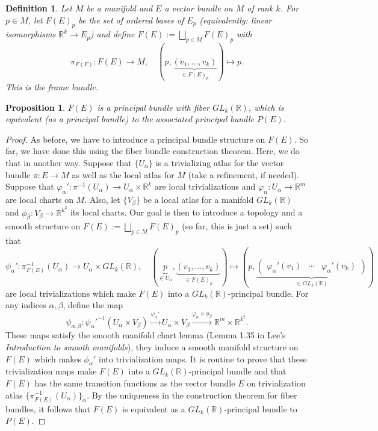 \documentclass[10pt, a4paper]{article}
\newtheorem{proposition}[thm]{Proposition}
\newtheorem{defi}[thm]{Definition}
\newenvironment{noticeB}{%
  \tcolorbox[%
  notitle,
  empty,
  enhanced,  %
  breakable,
  coltext=black,
  colback=white, 
  fontupper=\rmfamily,
  noparskip,
  sharp corners,
  boxrule=-1pt,  %
  frame hidden,
  left=7pt,  %
  right=7pt,
  top=5pt,
  bottom=5pt,
  before skip=2.5ex plus 2pt,
  after skip=2.5ex plus 2pt,
  borderline west = {1.5pt}{-0.1pt}{blue!30!black}, %
  overlay unbroken and last={%
    \draw[color=black, line width=1.25pt]
    ($(frame.south west)+(1.pt, -0.1pt)$) -- ++(2em, 0);
  }
  ]}
{\endtcolorbox}
\newenvironment{definition}{\begin{noticeB}\begin{defi}}{%
    \end{defi}\end{noticeB}}
\newenvironment{noticeC}{%
  \tcolorbox[%
  notitle,
  empty,
  enhanced,  %
  breakable,
  coltext=black, 
  fontupper=\rmfamily,
  noparskip,
  sharp corners,
  boxrule=-1pt,  %
  frame hidden,
  left=7pt,  %
  right=7pt,
  top=5pt,
  bottom=5pt,
  before skip=2.5ex plus 2pt,
  after skip=2.5ex plus 2pt,
  overlay unbroken and last={%
  },
  ]}
{\endtcolorbox}
\newenvironment{myproof}%
  {\begin{noticeC}\begin{proof}}%
  {\end{proof}\end{noticeC}}
\newcommand{\R}{\mathbb {R}}
\begin{document}
\begin{definition}
  Let $M$ be a manifold and $E$ a vector bundle on $M$ of rank $k$.
  For $p \in M$, let $F(E)_p$ be the set of ordered bases of $E_p$ 
  (equivalently: linear isomorphisms $\R^k \to E_p$) and define $F(E) := \bigsqcup_{p \in M} F(E)_p$ with 
  $$\pi_{F(F)}: F(E) \to M,\quad (p, \underbrace{(v_1, \dots, v_k)}_{\in F(E)_p}) \mapsto p.$$
  This is the frame bundle.
\end{definition}

\begin{proposition}
  $F(E)$ is a principal bundle with fiber $GL_k (\R)$, which is equivalent (as a principal bundle)
  to the associated principal bundle $P(E)$.
\end{proposition}

\begin{myproof}
  As before, we have to introduce a principal bundle structure on $F(E)$.
  So far, we have done this using the fiber bundle construction theorem.
  Here, we do that in another way. Suppose that $\{U_\alpha\}$ is a trivializing atlas for the vector bundle $\pi: E \to M$
  as well as the local atlas for $M$ (take a refinement, if needed). Suppose that $\varphi_\alpha ': \pi ^{-1} (U_\alpha) \to U_\alpha \times \R^k$
  are local trivializations and $\varphi_\alpha: U_\alpha \to \R^m$ are local charts on $M$.
  Also, let $\{V_\beta\}$ be a local atlas for a manifold $GL_k (\R)$ and $\phi_\beta: V_\beta \to \R^{k^2}$ its local charts.
  Our goal is then to introduce a topology and a smooth structure on $F(E) := \bigsqcup_{p \in M} F(E)_p$ (so far, this is just a set)
  such that 
  $$\psi_\alpha ': \pi_{F(E)} ^{-1} (U_\alpha) \to U_\alpha \times GL_k (\R),\quad (\underbrace{p}_{\in U_\alpha}, \underbrace{(v_1, \dots, v_k)}_{\in F(E)_p}) \mapsto (p, \underbrace{\begin{pmatrix}
    \varphi_\alpha ' (v_1) & \cdots & \varphi_\alpha' (v_k)
  \end{pmatrix}}_{\in GL_k (\R)})$$
  are local trivializations which make $F(E)$ into a $GL_k (\R)$-principal bundle.
  For any indices $\alpha, \beta$, define the map 
  $$\psi_{\alpha, \beta}: {\psi_\alpha '} ^{-1}(U_\alpha \times V_\beta) \xrightarrow{\psi_\alpha '} U_\alpha \times V_\beta \xrightarrow{\varphi_\alpha \times \phi_\beta} \R^{m} \times \R^{k^2}.$$
  These maps satisfy the smooth manifold chart lemma (Lemma 1.35 in Lee's \emph{Introduction to smooth manifolds}),
  they induce a smooth manifold structure on $F(E)$ which makes $\phi_\alpha '$
  into trivialization maps. It is routine to prove that these trivialization maps make $F(E)$
  into a $GL_k (\R)$-principal bundle and that $F(E)$ has the same transition functions as the vector bundle $E$
  on trivialization atlas $\{\pi_{F(E)} ^{-1} (U_\alpha)\}_{\alpha}$.
  By the uniqueness in the construction theorem for fiber bundles, it follows that $F(E)$ is equivalent as a $GL_k (\R)$-principal bundle to $P(E)$.
\end{myproof}
\end{document}
